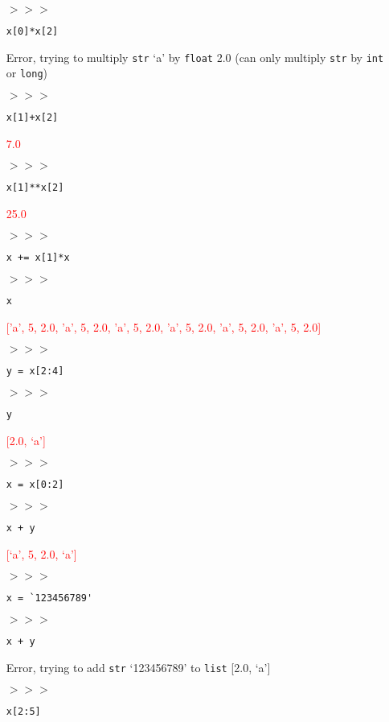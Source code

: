 \documentclass[11pt]{article}
\newcommand{\ans}[1]{\textcolor{red}{#1}}
\begin{document}
\begin{itemize}
\item[$>>>$] \begin{verbatim}x[0]*x[2]\end{verbatim}
\item[] Error, trying to multiply \texttt{str} `a' by \texttt{float}
  2.0 (can only multiply \texttt{str} by \texttt{int} or \texttt{long})
\item[$>>>$] \begin{verbatim}x[1]+x[2]\end{verbatim}
\item[] \ans{7.0}
\item[$>>>$] \begin{verbatim}x[1]**x[2]\end{verbatim}
\item[] \ans{25.0}
\item[$>>>$] \begin{verbatim}x += x[1]*x\end{verbatim}
\item[$>>>$] \begin{verbatim}x\end{verbatim}
\item[] \ans{['a', 5, 2.0, 'a', 5, 2.0, 'a', 5, 2.0, 'a', 5, 2.0, 'a', 5, 2.0, 'a', 5, 2.0]}
\item[$>>>$] \begin{verbatim}y = x[2:4]\end{verbatim}
\item[$>>>$] \begin{verbatim}y\end{verbatim}
\item[] \ans{[2.0, `a']}
\item[$>>>$] \begin{verbatim}x = x[0:2]\end{verbatim}
\item[$>>>$] \begin{verbatim}x + y\end{verbatim}
\item[] \ans{[`a', 5, 2.0, `a']}
\item[$>>>$] \begin{verbatim}x = `123456789'\end{verbatim}
\item[$>>>$] \begin{verbatim}x + y\end{verbatim}
\item[] Error, trying to add \texttt{str} `123456789' to
    \texttt{list} [2.0, `a']
\item[$>>>$] \begin{verbatim}x[2:5]\end{verbatim}

\end{itemize}
\end{document}
